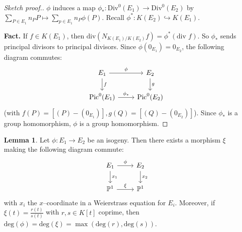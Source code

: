 \documentclass{article}
\theoremstyle{definition}
\newtheorem{lemma}[theorem]{Lemma}
\begin{document}
\begin{proof}[Sketch proof.]
    $\phi$ induces a map $\phi_* : \text{Div}^0(E_1) \to \text{Div}^0(E_2)$ by $\sum_{P \in E_1}^{} n_P P \mapsto \sum_{p \in E_1}^{} n_P \phi(P)$. Recall $\phi^* : K(E_2) \hookrightarrow K(E_1)$.
    \vspace{1mm}
     
    \textbf{Fact.} If $f \in K(E_1)$, then $\text{div}(N_{K(E_1)/K(E_2)}f) = \phi^*(\text{div }f)$. So $\phi_*$ sends principal divisors to principal divisors. Since $\phi(0_{E_1}) = 0_{E_2}$, the following diagram commutes: $$\begin{tikzcd}[]
        E_1 & E_2\\
        \text{Pic}^0(E_1) & \text{Pic}^0(E_2)
        \arrow["\phi", from=1-1, to=1-2]
        \arrow["g", from=1-2, to=2-2]
        \arrow["f", from=1-1, to=2-1]
        \arrow["\phi_*", from=2-1, to=2-2]
    \end{tikzcd}$$ (with $f(P) = [(P)-(0_{E_1})], g(Q) = [(Q)-(0_{E_2})]$). Since $\phi_*$ is a group homomorphism, $\phi$ is a group homomorphism.
\end{proof}
\begin{lemma}\label{lemma5.4}
    Let $\phi : E_1 \to E_2$ be an isogeny. Then there exists a morphism $\xi$ making the following diagram commute:
    $$\begin{tikzcd}[]
        E_1 & E_2\\
        \mathbb{P}^1 & \mathbb{P}^1
        \arrow["\phi", from=1-1, to=1-2]
        \arrow["x_2", from=1-2, to=2-2]
        \arrow["x_1 ", from=1-1, to=2-1]
        \arrow["\xi", from=2-1, to=2-2]
    \end{tikzcd}$$
    with $x_i$ the $x$--coordinate in a Weierstrass equation for $E_i$. Moreover, if $\xi(t)=\frac{r(t)}{s(t)}$ with $r,s \in K[t]$ coprime, then $\text{deg}(\phi) = \text{deg}(\xi) = \max(\text{deg}(r),\text{deg}(s))$.
\end{lemma}
\end{document}

